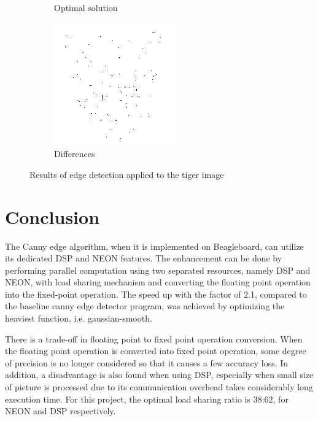 \documentclass[conference]{IEEEtran}
\begin{document}
\begin{figure}[!ht]
\begin{subfigure}[b]{0.2\textwidth}
    \caption{Optimal solution}
    \label{fig:tigerOptSol}
\end{subfigure}
\begin{subfigure}[b]{0.2\textwidth}
    \includegraphics[width=\textwidth]{pic/tiger_38_u32_error}
    \caption{Differences}
    \label{fig:tigerDiffOptSol}
\end{subfigure}
   \caption{Results of edge detection applied to the tiger image}
   \label{fig:tigerComparison}
\end{figure} 

\section{Conclusion}
The Canny edge algorithm, when it is implemented on Beagleboard, can utilize its dedicated DSP and NEON features. The enhancement can be done by performing parallel computation using two separated resources, namely DSP and NEON, with load sharing mechanism and converting the floating point operation into the fixed-point operation. The speed up with the factor of 2.1, compared to the baseline canny edge detector program, was achieved by optimizing the heaviest function, i.e. gaussian-smooth.

There is a trade-off in floating point to fixed point operation conversion. When the floating point operation is converted into fixed point operation, some degree of precision is no longer considered so that it causes a few accuracy loss. In addition, a disadvantage is also found when using DSP, especially when small size of picture is processed due to its communication overhead takes considerably long execution time. For this project, the optimal load sharing ratio is 38:62, for NEON and DSP respectively.
\end{document}
